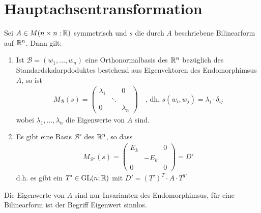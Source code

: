\section{Hauptachsentransformation}

\vspace{1\baselineskip}


\vspace{1\baselineskip}

Sei $A \in M(n \times n \ ; \mathbb{R})$ symmetrisch und $s$ die durch $A$ beschriebene Bilinearform
auf $\mathbb{R}^n$. Dann gilt:
\begin{enumerate}[{1)}]
    \item Ist $\mathcal{B} = (w_1,\dots,w_n)$ eine Orthonormalbasis des $\mathbb{R}^n$ bezüglich des
            Standardskalarpdoduktes bestehend aus Eigenvektoren des Endomorphimsus $A$, so ist
            \begin{align*}
                M_{\mathcal{B}} (s) = \begin{pmatrix}
                    \lambda_1 & & 0 \\
                    & \ddots & \\
                    0 & & \lambda_n
                \end{pmatrix}
                \quad \text{, dh. } s(w_i , w_j) = \lambda_i \cdot \delta_{ij}
            \end{align*}
            wobei $\lambda_1,\dots,\lambda_n$ die Eigenwerte von $A$ sind.
    \item Es gibt eine Basis $\mathcal{B}'$ des $\mathbb{R}^n$, so dass
            \begin{align*}
                M_{\mathcal{B}'} (s) = \begin{pmatrix}
                    E_k & & 0 \\
                    & - E_k & \\
                    0 & & 0 
                \end{pmatrix}
                = D'
            \end{align*}
            d.h. es gibt ein $T' \in \text{GL} (n;\mathbb{R})$ mit $D' = (T')^T \cdot A \cdot T^T$
\end{enumerate}

\vspace{1\baselineskip}

Die Eigenwerte von $A$ sind nur Invarianten des Endomorphimsus, für eine Bilinearform
ist der Begriff Eigenwert sinnlos.

